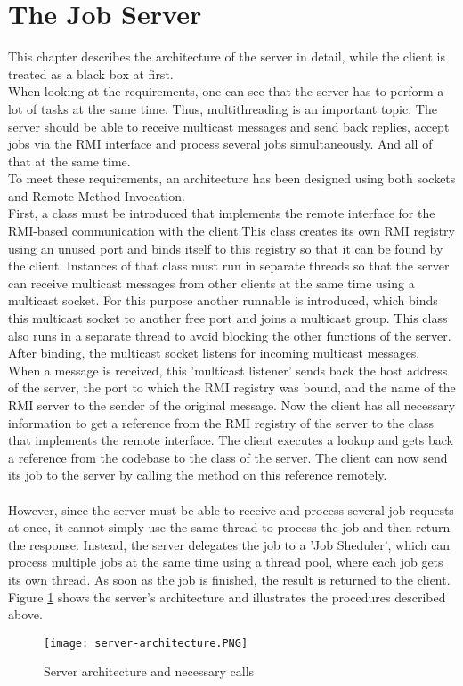 \section{The Job Server}
This chapter describes the architecture of the server in detail, while the client is treated as a black box at first.\\
When looking at the requirements, one can see that the server has to perform a lot of tasks at the same time. Thus, multithreading is an important topic. The server should be able to receive multicast messages and send back replies, accept jobs via the RMI interface and process several jobs simultaneously. And all of that at the same time.
\\
To meet these requirements, an architecture has been designed using both sockets and Remote Method Invocation.
\\
First, a class must be introduced that implements the remote interface for the RMI-based communication with the client.This class creates its own RMI registry using an unused port and binds itself to this registry so that it can be found by the client. Instances of that class must run in separate threads so that the server can receive multicast messages from other clients at the same time using a multicast socket. For this purpose another runnable is introduced, which binds this multicast socket to another free port and joins a multicast group. This class also runs in a separate thread to avoid blocking the other functions of the server. After binding, the multicast socket listens for incoming multicast messages.
\\
When a message is received, this 'multicast listener' sends back the host address of the server, the port to which the RMI registry was bound, and the name of the RMI server to the sender of the original message. Now the client has all necessary information to get a reference from the RMI registry of the server to the class that implements the remote interface. The client executes a lookup and gets back a reference from the codebase to the class of the server. The client can now send its job to the server by calling the method on this reference remotely.
\\\\
However, since the server must be able to receive and process several job requests at once, it cannot simply use the same thread to process the job and then return the response. Instead, the server delegates the job to a 'Job Sheduler', which can process multiple jobs at the same time using a thread pool, where each job gets its own thread. As soon as the job is finished, the result is returned to the client. Figure \ref{server-architecture} shows the server's architecture and illustrates the procedures described above.
\begin{figure}[H]
	\centering
	\texttt{[image: server-architecture.PNG]}
	\caption{Server architecture and necessary calls}
	\label{server-architecture}
\end{figure} 

